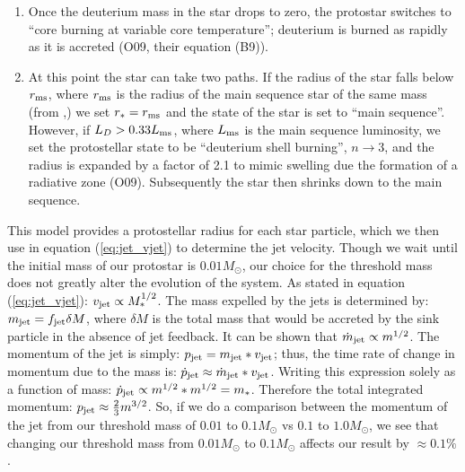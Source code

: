 \documentclass[../dissertation.tex]{subfiles}
\begin{document}
\begin{enumerate}
\item Once the deuterium mass in the star drops to zero, the protostar switches to ``core burning at variable core temperature''; deuterium is burned as rapidly as it is accreted (O09, their equation (B9)).
\item At this point the star can take two paths.
If the radius of the star falls below $r_{\rm ms}$, where $r_{\rm ms}$ is the radius of the main sequence star of the same mass (from \citet{1967CaJPh..45.3429E},) we set $r_*=r_{\rm ms}$ and the state of the star is set to ``main sequence''.
However, if $L_D > 0.33 L_{\rm ms}$, where $L_{\rm ms}$ is the main sequence luminosity, we set the protostellar state to be ``deuterium shell burning'', $n\rightarrow 3$, and the radius is expanded by a factor of 2.1 to mimic swelling due the formation of a radiative zone (O09).
Subsequently the star then shrinks down to the main sequence.
\end{enumerate}
This model provides a protostellar radius for each star particle, which we then use in equation (\ref{eq:jet_vjet}) to determine the jet velocity.
Though we wait until the initial mass of our protostar is $0.01 M_\odot$, our choice for the threshold mass does not greatly alter the evolution of the system.
As stated in equation (\ref{eq:jet_vjet}): $v_{\rm jet} \propto M_*^{1/2}$.
The mass expelled by the jets is determined by: $m_{\rm jet} = f_{\rm jet} \delta M$, where  $\delta M$ is the total mass that would be accreted by the sink particle in the absence of jet feedback. 
It can be shown that $\dot{m}_{\rm jet} \propto m^{1/2}$.
The momentum of the jet is simply: $p_{\rm jet} = m_{\rm jet} * v_{\rm jet}$; 
thus, the time rate of change in momentum due to the mass is: $\dot{p}_{\rm jet} \approx \dot{m}_{\rm jet} * v_{\rm jet}$.
Writing this expression solely as a function of mass: $\dot{p}_{\rm jet} \propto m^{1/2} * m^{1/2} = m_*$. 
Therefore the total integrated momentum: $p_{\rm jet} \approx \frac{2}{3} m^{3/2}$.
So, if we do a comparison between the momentum of the jet from our threshold mass of $0.01$ to $0.1 M_\odot$ vs $0.1$ to $1.0 M_\odot$, we see that changing our threshold mass from $0.01 M_\odot$ to $0.1 M_\odot$ affects our result by $\approx 0.1 \%$.
\end{document}
